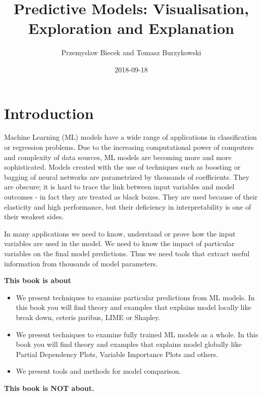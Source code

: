 \documentclass[]{book}
\title{Predictive Models: Visualisation, Exploration and Explanation}
\author{Przemyslaw Biecek and Tomasz Burzykowski}
\date{2018-09-18}
\providecommand{\tightlist}{%
  \setlength{\itemsep}{0pt}\setlength{\parskip}{0pt}}
\theoremstyle{definition}
\theoremstyle{definition}
\theoremstyle{definition}
\theoremstyle{remark}
\begin{document}
\maketitle

{
\setcounter{tocdepth}{1}
\tableofcontents
}
\hypertarget{introduction}{%
\chapter{Introduction}\label{introduction}}

Machine Learning (ML) models have a wide range of applications in
classification or regression problems. Due to the increasing
computational power of computers and complexity of data sources, ML
models are becoming more and more sophisticated. Models created with the
use of techniques such as boosting or bagging of neural networks are
parametrized by thousands of coefficients. They are obscure; it is hard
to trace the link between input variables and model outcomes - in fact
they are treated as black boxes. They are used because of their
elasticity and high performance, but their deficiency in
interpretability is one of their weakest sides.

In many applications we need to know, understand or prove how the input
variables are used in the model. We need to know the impact of
particular variables on the final model predictions. Thus we need tools
that extract useful information from thousands of model parameters.

\textbf{This book is about}

\begin{itemize}
\tightlist
\item
  We present techniques to examine particular predictions from ML
  models. In this book you will find theory and examples that explains
  model locally like break down, ceteris paribus, LIME or Shapley.
\item
  We present techniques to examine fully trained ML models as a whole.
  In this book you will find theory and examples that explains model
  globally like Partial Dependency Plots, Variable Importance Plots and
  others.
\item
  We present tools and methods for model comparison.
\end{itemize}

\textbf{This book is NOT about.}
\end{document}

